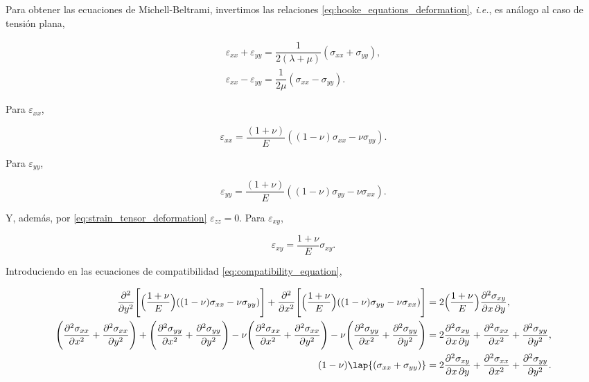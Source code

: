 \documentclass[./../main.tex]{subfiles}
\begin{document}
    Para obtener las ecuaciones de Michell-Beltrami, invertimos las relaciones \cref{eq:hooke_equations_deformation}, \emph{i.e.}, es análogo al caso de tensión plana,

    \begin{align*}
        \varepsilon_{xx} + \varepsilon_{yy} = \dfrac{1}{2(\lambda + \mu)}(\sigma_{xx} + \sigma_{yy}),\\
        \varepsilon_{xx} - \varepsilon_{yy} = \dfrac{1}{2\mu}(\sigma_{xx} - \sigma_{yy}).
    \end{align*}

    Para \(\varepsilon_{xx}\),

    \begin{equation}
        \varepsilon_{xx} = \dfrac{(1 + \nu)}{E}((1 - \nu)\sigma_{xx} - \nu\sigma_{yy}).
        \label{eq:epsilon_xx_deformation}
    \end{equation}

    Para \(\varepsilon_{yy}\),

    \begin{equation}
        \varepsilon_{yy} = \dfrac{(1 + \nu)}{E}((1 - \nu)\sigma_{yy} - \nu\sigma_{xx}).
        \label{eq:epsilon_yy_deformation}
    \end{equation}

    Y, además, por \cref{eq:strain_tensor_deformation} \(\varepsilon_{zz} = 0\). Para \(\varepsilon_{xy}\),

    \begin{equation}
        \varepsilon_{xy} = \dfrac{1 + \nu}{E}\sigma_{xy}.
        \label{eq:epsilon_xy_deformation}
    \end{equation}

    Introduciendo  en las ecuaciones de compatibilidad \cref{eq:compatibility_equation},

    \begin{align*}
        \pdv[order=2]{}{y}\Biggl[\Bigl(\dfrac{1 + \nu}{E}\Bigr)((1 -  \nu)\sigma_{xx} - \nu\sigma_{yy})\Biggr] + \pdv[order=2]{}{x}\Biggl[\Bigl(\dfrac{1 + \nu}{E}\Bigr)((1 -  \nu)\sigma_{yy} - \nu\sigma_{xx})\Biggr] &= 2\Bigl(\dfrac{1 + \nu}{E}\Bigr)\pdv{\sigma_{xy}}{x,y},\\
        \Biggl(\pdv[order=2]{\sigma_{xx}}{x} + \pdv[order=2]{\sigma_{xx}}{y}\Biggr) + \Biggl(\pdv[order=2]{\sigma_{yy}}{x} + \pdv[order=2]{\sigma_{yy}}{y}\Biggr) - \nu\Biggl(\pdv[order=2]{\sigma_{xx}}{x} + \pdv[order=2]{\sigma_{xx}}{y}\Biggr) - \nu\Biggl(\pdv[order=2]{\sigma_{yy}}{x} + \pdv[order=2]{\sigma_{yy}}{y}\Biggr) &= 2\pdv{\sigma_{xy}}{x,y} + \pdv[order=2]{\sigma_{xx}}{x} + \pdv[order=2]{\sigma_{yy}}{y},\\
        (1 - \nu)\lap{(\sigma_{xx} + \sigma_{yy})} &= 2\pdv{\sigma_{xy}}{x,y} + \pdv[order=2]{\sigma_{xx}}{x} + \pdv[order=2]{\sigma_{yy}}{y}.
    \end{align*}
\end{document}
